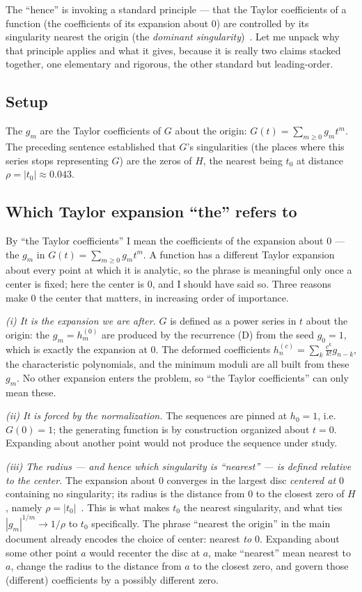\documentclass[11pt]{amsart}
\begin{document}
The ``hence'' is invoking a standard principle --- that the Taylor coefficients of a
function (the coefficients of its expansion about $0$) are controlled by its singularity
nearest the origin (the \emph{dominant singularity})~\cite{Hadamard1892,FlajoletSedgewick2009}.
Let me unpack why that principle applies and what it gives, because it is really two claims
stacked together, one elementary and rigorous, the other standard but leading-order.

\subsection*{Setup}
The $g_m$ are the Taylor coefficients of $G$ about the origin: $G(t)=\sum_{m\ge0} g_m t^m$.
The preceding sentence established that $G$'s singularities (the places where this series
stops representing $G$) are the zeros of $H$, the nearest being $t_0$ at distance
$\rho=|t_0|\approx0.043$.

\subsection*{Which Taylor expansion ``the'' refers to}
By ``the Taylor coefficients'' I mean the coefficients of the expansion about $0$ --- the
$g_m$ in $G(t)=\sum_{m\ge0}g_m t^m$. A function has a different Taylor expansion about every
point at which it is analytic, so the phrase is meaningful only once a center is fixed; here
the center is $0$, and I should have said so. Three reasons make $0$ the center that
matters, in increasing order of importance.

\emph{(i) It is the expansion we are after.} $G$ is defined as a power series in $t$ about
the origin: the $g_m=h_m^{(0)}$ are produced by the recurrence (D) from the seed $g_0=1$,
which is exactly the expansion at $0$. The deformed coefficients
$h_n^{(c)}=\sum_k\frac{c^k}{k!}g_{n-k}$, the characteristic polynomials, and the minimum
moduli are all built from these $g_m$. No other expansion enters the problem, so ``the
Taylor coefficients'' can only mean these.

\emph{(ii) It is forced by the normalization.} The sequences are pinned at $h_0=1$, i.e.\
$G(0)=1$; the generating function is by construction organized about $t=0$. Expanding about
another point would not produce the sequence under study.

\emph{(iii) The radius --- and hence which singularity is ``nearest'' --- is defined
relative to the center.} The expansion about $0$ converges in the largest disc
\emph{centered at $0$} containing no singularity; its radius is the distance from $0$ to the
closest zero of $H$, namely $\rho=|t_0|$~\cite{Ahlfors,Hadamard1892}. This is what makes
$t_0$ the nearest singularity, and what ties $|g_m|^{1/m}\to1/\rho$ to $t_0$ specifically.
The phrase ``nearest the origin'' in the main document already encodes the choice of center:
nearest \emph{to $0$}. Expanding about some other point $a$ would recenter the disc at $a$,
make ``nearest'' mean nearest to $a$, change the radius to the distance from $a$ to the
closest zero, and govern those (different) coefficients by a possibly different zero.
\end{document}
